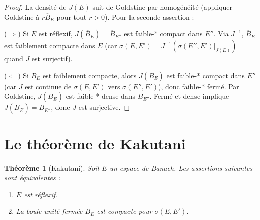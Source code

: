 \documentclass[a4paper,12pt]{book}
\theoremstyle{definition}
\theoremstyle{plain}
\newtheorem{theoreme}[definition]{Théorème}
\theoremstyle{remark}
\begin{document}
\begin{proof}
La densité de $J(E)$ suit de Goldstine par homogénéité (appliquer Goldstine à
$r \overline{B}_E$ pour tout $r > 0$). Pour la seconde assertion :

($\Rightarrow$) Si $E$ est réflexif, $J(\overline{B}_E) = \overline{B}_{E''}$ est
faible-* compact dans $E''$. Via $J^{-1}$, $\overline{B}_E$ est faiblement compacte
dans $E$ (car $\sigma(E,E') = J^{-1}(\sigma(E'',E')|_{J(E)})$ quand $J$ est surjectif).

($\Leftarrow$) Si $\overline{B}_E$ est faiblement compacte, alors $J(\overline{B}_E)$
est faible-* compact dans $E''$ (car $J$ est continue de $\sigma(E,E')$ vers
$\sigma(E'',E')$), donc faible-* fermé. Par Goldstine, $J(\overline{B}_E)$ est
faible-* dense dans $\overline{B}_{E''}$. Fermé et dense implique
$J(\overline{B}_E) = \overline{B}_{E''}$, donc $J$ est surjective.
\end{proof}


\section{Le théorème de Kakutani}
\label{sec:kakutani}


\begin{theoreme}[Kakutani]
\label{thm:kakutani}
Soit $E$ un espace de Banach. Les assertions suivantes sont équivalentes :
\begin{enumerate}[label=(\roman*)]
  \item $E$ est réflexif.
  \item La boule unité fermée $\overline{B}_E$ est compacte pour $\sigma(E,E')$.
\end{enumerate}
\end{theoreme}
\end{document}
